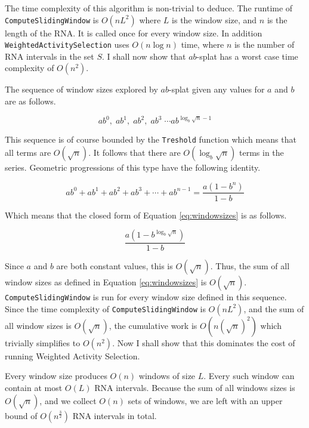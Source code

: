 \documentclass{cshonours}
\begin{document}
The time complexity of this algorithm is non-trivial to deduce. The runtime of \texttt{ComputeSlidingWindow} is $O(nL^2)$ where $L$ is the window size, and $n$ is the length of the RNA. It is called once for every window size. In addition \texttt{WeightedActivitySelection} uses $O(n \log n)$ time, where $n$ is the number of RNA intervals in the set $S$. I shall now show that $ab$-splat has a worst case time complexity of $O(n^2)$.

The sequence of window sizes explored by $ab$-splat given any values for $a$ and $b$ are as follows.

\begin{equation} \label{eq:windowsizes}
	ab^0, \; ab^1, \; ab^2, \; ab^3 \; \cdots ab^{\log_b \sqrt{n}-1}
\end{equation}

This sequence is of course bounded by the \texttt{Treshold} function which means that all terms are $O(\sqrt{n})$. It follows that there are $O(\log_b \sqrt{n})$ terms in the series.  Geometric progressions of this type have the following identity.


\begin{equation}
	ab^0 +  ab^1 +  ab^2 +  ab^3 +  \cdots + ab^{n-1} = \frac{a(1-b^n)}{1-b}
\end{equation}

Which means that the closed form of Equation \ref{eq:windowsizes} is as follows.

\begin{equation}
  \frac{a(1-b^{\log_b \sqrt{n}})}{1-b}
\end{equation}

Since $a$ and $b$ are both constant values, this is $O(\sqrt{n})$. Thus, the sum of all window sizes as defined in Equation \ref{eq:windowsizes} is $O(\sqrt{n})$. \texttt{ComputeSlidingWindow} is run for every window size defined in this sequence. Since the time complexity of \texttt{ComputeSlidingWindow} is $O(nL^2)$, and the sum of all window sizes is $O(\sqrt{n})$, the cumulative work is $O(n(\sqrt{n})^2)$ which trivially simplifies to $O(n^2)$. Now I shall show that this dominates the cost of running Weighted Activity Selection.

Every window size produces $O(n)$ windows of size $L$. Every such window can contain at most $O(L)$ RNA intervals. Because the sum of all windows sizes is $O(\sqrt{n})$, and we collect $O(n)$ sets of windows, we are left with an upper bound of $O(n^\frac{3}{2})$ RNA intervals in total.
\end{document}
